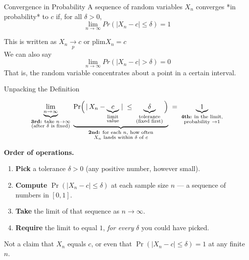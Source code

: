 \documentclass[handout, aspectratio=169]{beamer}
\numberwithin{equation}{section}
\begin{document}

\begin{frame}{Convergence in Probability}
A sequence of random variables $X_n$ converges *in probability* to $c$ if, for all $\delta>0$,
$$\lim_{n\rightarrow \infty} Pr(|X_n-c|\leq \delta)=1$$

This is written as $X_n\underset{p}{\to} c$ or $\text{plim}X_n=c$\\
We can also say
$$\lim_{n\rightarrow \infty} Pr(|X_n-c|> \delta)=0$$
That is, the random variable concentrates about a point in a certain interval.
\end{frame}


\begin{frame}{Unpacking the Definition}

\vspace{0.5em}
\[
\underbrace{\lim_{n\to\infty}}_{\substack{\text{\textbf{3rd:} take }n\to\infty\\ \text{(after $\delta$ is fixed)}}}\;
\underbrace{\Pr\!\Big(\,|\,X_n - \underbrace{c}_{\substack{\text{limit}\\\text{value}}}\,|\;\leq\;\underbrace{\delta}_{\substack{\text{tolerance}\\ \text{(fixed first)}}}\Big)}_{\substack{\text{\textbf{2nd:} for each }n,\text{ how often}\\ X_n\text{ lands within }\delta\text{ of }c}}
\;=\;\underbrace{1}_{\substack{\text{\textbf{4th:} in the limit,}\\ \text{probability }\to 1}}
\]

\vspace{0.8em}
\textbf{Order of operations.}
\begin{enumerate}
\item \textbf{Pick} a tolerance $\delta>0$ (any positive number, however small).
\item \textbf{Compute} $\Pr(|X_n-c|\leq\delta)$ at each sample size $n$ --- a sequence of numbers in $[0,1]$.
\item \textbf{Take} the limit of that sequence as $n\to\infty$.
\item \textbf{Require} the limit to equal $1$, \emph{for every} $\delta$ you could have picked.
\end{enumerate}

\vspace{0.3em}
\alert{Not} a claim that $X_n$ equals $c$, or even that $\Pr(|X_n-c|\leq\delta)=1$ at any finite $n$.

\end{frame}
\end{document}
